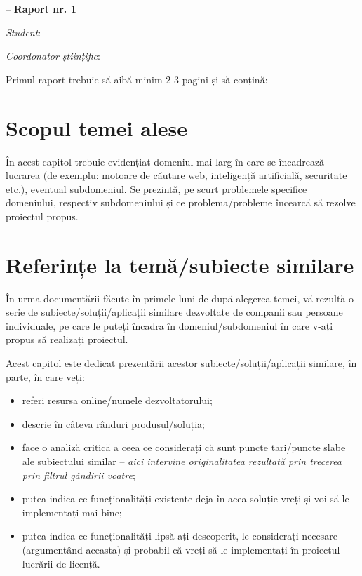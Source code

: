 \documentclass[12pt]{report}
\begin{document}


\begin{center}
    \large
    {\textbf{\thesistype} -- \textbf{Raport nr. 1}}
    
    \vspace{0.5cm}
    
    \normalsize
    \textbf{\thesistitle}
\end{center}

\textit{Student}: \textbf{\authornamefl}

\textit{Coordonator științific}: \textbf{\coordinator}

\vspace{0.5cm}

Primul raport trebuie să aibă minim 2-3 pagini și să conțină:

\section*{Scopul temei alese}

În acest capitol trebuie evidențiat domeniul mai larg în care se încadrează lucrarea (de exemplu: motoare de căutare web, inteligență artificială, securitate etc.), eventual subdomeniul. Se prezintă, pe scurt problemele specifice domeniului, respectiv subdomeniului și ce problema/probleme încearcă să rezolve proiectul propus.

\section*{Referințe la temă/subiecte similare}

În urma documentării făcute în primele luni de după alegerea temei, vă rezultă o serie de subiecte/soluții/aplicații similare dezvoltate de companii sau persoane individuale, pe care le puteți încadra în domeniul/subdomeniul în care v-ați propus să realizați proiectul. 

Acest capitol este dedicat prezentării acestor subiecte/soluții/aplicații similare, în parte, în care veți:
\begin{itemize}
    \item referi resursa online/numele dezvoltatorului;
    \item descrie în câteva rânduri produsul/soluția;
    \item face o analiză critică a ceea ce considerați că sunt puncte tari/puncte slabe ale subiectului similar -- \textit{aici intervine originalitatea rezultată prin trecerea prin filtrul gândirii voatre};
    \item putea indica ce funcționalități existente deja în acea soluție vreți și voi să le implementați mai bine;
    \item putea indica ce funcționalități lipsă ați descoperit, le considerați necesare (argumentând aceasta) și probabil că vreți să le implementați în proiectul lucrării de licență.
\end{itemize}
\end{document}
